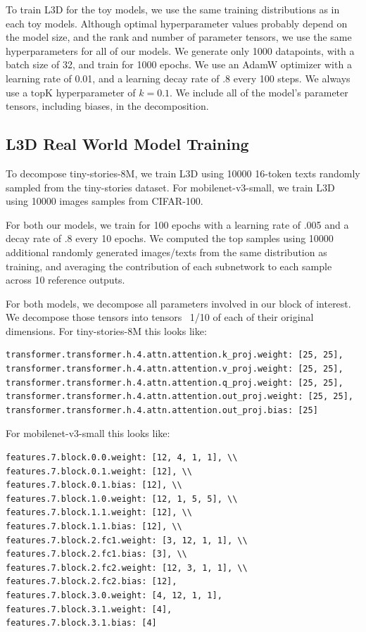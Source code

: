 \documentclass{article}
\theoremstyle{plain}
\theoremstyle{definition}
\theoremstyle{remark}
\begin{document}
To train L3D for the toy models, we use the same training distributions as in each toy models. Although optimal hyperparameter values probably depend on the model size, and the rank and number of parameter tensors, we use the same hyperparameters for all of our models. We generate only 1000 datapoints, with a batch size of 32, and train for 1000 epochs. We use an AdamW optimizer with a learning rate of 0.01, and a learning decay rate of .8 every 100 steps. We always use a $\text{topK}$ hyperparameter of $k=0.1$.  We include all of the model's parameter tensors, including biases, in the decomposition. 

\subsection{L3D Real World Model Training}\label{sec:realworld_hyperparams}

To decompose tiny-stories-8M, we train L3D using 10000 16-token texts randomly sampled from the tiny-stories dataset.  For mobilenet-v3-small, we train L3D using 10000 images samples from CIFAR-100.

For both our models, we train for 100 epochs with a learning rate of .005 and a decay rate of .8 every 10 epochs. We computed the top samples using 10000 additional randomly generated images/texts from the same distribution as training, and averaging the contribution of each subnetwork to each sample across 10 reference outputs. 

For both models, we decompose all parameters involved in our block of interest. We decompose those tensors into tensors ~1/10 of each of their original dimensions. For tiny-stories-8M this looks like:
\begin{verbatim}
transformer.transformer.h.4.attn.attention.k_proj.weight: [25, 25],
transformer.transformer.h.4.attn.attention.v_proj.weight: [25, 25],
transformer.transformer.h.4.attn.attention.q_proj.weight: [25, 25],
transformer.transformer.h.4.attn.attention.out_proj.weight: [25, 25],
transformer.transformer.h.4.attn.attention.out_proj.bias: [25]
\end{verbatim}

For mobilenet-v3-small this looks like:

\begin{verbatim}
features.7.block.0.0.weight: [12, 4, 1, 1], \\
features.7.block.0.1.weight: [12], \\
features.7.block.0.1.bias: [12], \\
features.7.block.1.0.weight: [12, 1, 5, 5], \\
features.7.block.1.1.weight: [12], \\
features.7.block.1.1.bias: [12], \\
features.7.block.2.fc1.weight: [3, 12, 1, 1], \\
features.7.block.2.fc1.bias: [3], \\
features.7.block.2.fc2.weight: [12, 3, 1, 1], \\
features.7.block.2.fc2.bias: [12],
features.7.block.3.0.weight: [4, 12, 1, 1],
features.7.block.3.1.weight: [4],
features.7.block.3.1.bias: [4]
\end{verbatim}
\end{document}
